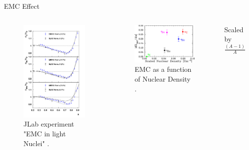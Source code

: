 \documentclass{beamer}
\begin{document}
\begin{frame}{EMC Effect}
	\begin{columns}
		\vspace{-15pt}
		\begin{figure}
			\caption{\label{E03103} JLab experiment "EMC in light Nuclei" \cite{E3103}.}
			\vspace{-20pt}
			\includegraphics[width =5cm]{../images/carbon_be_he4}
		\end{figure}
		\hspace{10pt}
		\begin{figure}
			\caption{\label{E03103_1} EMC as a function of Nuclear Density \cite{E3103}.}
			\includegraphics[width =6cm]{../images/PRL_slopes}
		\end{figure}
		\centering
		Scaled by $\frac{\left(A-1\right)}{A}$
	\end{columns}
\end{frame}
\end{document}
